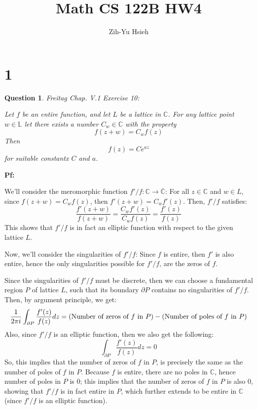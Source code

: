 \documentclass{article}
\title{Math CS 122B HW4}
\author{Zih-Yu Hsieh}
\newtheorem{question}{Question}
\begin{document}
\maketitle

\section*{1}
\begin{myBox}[]{}
    \begin{question}
        Freitag Chap. V.1 Exercise 10:

        Let $f$ be an entire function, and let $L$ be a lattice in $\mathbb{C}$. For any lattice point $w\in\mathbb{L}$ let there exists a number $C_w\in\mathbb{C}$ with the property 
        $$f(z+w)=C_wf(z)$$
        Then
        $$f(z)=Ce^{az}$$
        for suitable constantx $C$ and $a$.
    \end{question}
\end{myBox}

\textbf{Pf:}

We'll consider the meromorphic function $f'/f:\mathbb{C}\rightarrow\overline{\mathbb{C}}$: For all $z\in\mathbb{C}$ and $w\in L$, since $f(z+w)=C_wf(z)$, then $f'(z+w)=C_wf'(z)$. Then, $f'/f$ satisfies:
$$\frac{f'(z+w)}{f(z+w)}=\frac{C_wf'(z)}{C_wf(z)}=\frac{f'(z)}{f(z)}$$
This shows that $f'/f$ is in fact an elliptic function with respect to the given lattice $L$.

\hfil

Now, we'll consider the singularities of $f'/f$: Since $f$ is entire, then $f'$ is also entire, hence the only singularities possible for $f'/f$, are the zeros of $f$.

Since the singularities of $f'/f$ must be discrete, then we can choose a fundamental region $P$ of lattice $L$, such that its boundary $\partial P$ contains no singularities of $f'/f$. Then, by argument principle, we get:
$$\frac{1}{2\pi i}\int_{\partial P}\frac{f'(z)}{f(z)}dz = (\textmd{Number of zeros of $f$ in $P$})-(\textmd{Number of poles of $f$ in $P$})$$
Also, since $f'/f$ is an elliptic function, then we also get the following:
$$\int_{\partial P}\frac{f'(z)}{f(z)}dz = 0$$
So, this implies that the number of zeros of $f$ in $P$, is precisely the same as the number of poles of $f$ in $P$.
Because $f$ is entire, there are no poles in $\mathbb{C}$, hence number of poles in $P$ is $0$; this implies that the number of zeros of $f$ in $P$ is also $0$, showing that $f'/f$ is in fact entire in $P$, which further extends to be entire in $\mathbb{C}$ (since $f'/f$ is an elliptic function).
\end{document}
